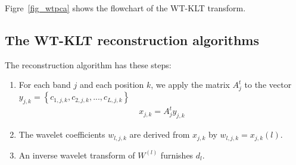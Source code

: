 Figre~\ref{fig_wtpca} shows the flowchart of the WT-KLT transform.


\subsection{The WT-KLT reconstruction algorithms}
 
The reconstruction algorithm has these steps:
\begin{enumerate}
\item For each band $j$ and each position $k$, we apply the matrix $A_j^t$
to the vector 
$y_{j,k} = \left\{ c_{1,j,k}, c_{2,j,k}, ..., c_{L,j,k} \right\}$
\begin{eqnarray}
  x_{j,k} = A_j^t y_{j,k}
\end{eqnarray}
\item The wavelet coefficients $w_{l,j,k}$ are derived from $x_{j,k}$ by
 $ w_{l,j,k} = x_{j,k}(l)$.
\item An inverse wavelet transform of $W^{(l)}$ furnishes $d_l$.   
\end{enumerate}




